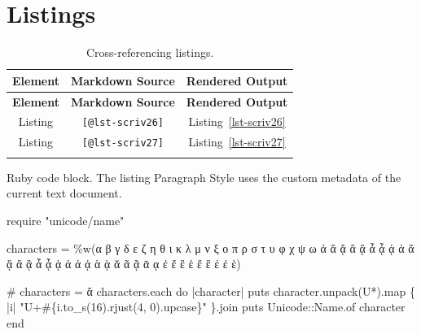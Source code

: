 \documentclass[
  12pt,
  a4paper,
  oneside,
  numbers=noenddot,
  titlepage,
  toclink=all,
  toc=bibliography]{scrbook}
\newenvironment{Shaded}{\begin{snugshade}}{\end{snugshade}}
\newcommand{\AttributeTok}[1]{\textcolor[rgb]{0.40,0.45,0.13}{#1}}
\newcommand{\CharTok}[1]{\textcolor[rgb]{0.13,0.47,0.30}{#1}}
\newcommand{\CommentTok}[1]{\textcolor[rgb]{0.37,0.37,0.37}{#1}}
\newcommand{\ControlFlowTok}[1]{\textcolor[rgb]{0.00,0.23,0.31}{#1}}
\newcommand{\DataTypeTok}[1]{\textcolor[rgb]{0.68,0.00,0.00}{#1}}
\newcommand{\DecValTok}[1]{\textcolor[rgb]{0.68,0.00,0.00}{#1}}
\newcommand{\FunctionTok}[1]{\textcolor[rgb]{0.28,0.35,0.67}{#1}}
\newcommand{\KeywordTok}[1]{\textcolor[rgb]{0.00,0.23,0.31}{#1}}
\newcommand{\NormalTok}[1]{\textcolor[rgb]{0.00,0.23,0.31}{#1}}
\newcommand{\OtherTok}[1]{\textcolor[rgb]{0.00,0.23,0.31}{#1}}
\newcommand{\SpecialCharTok}[1]{\textcolor[rgb]{0.37,0.37,0.37}{#1}}
\newcommand{\StringTok}[1]{\textcolor[rgb]{0.13,0.47,0.30}{#1}}
\newcommand{\VerbatimStringTok}[1]{\textcolor[rgb]{0.13,0.47,0.30}{#1}}
\theoremstyle{definition}
\theoremstyle{definition}
\theoremstyle{definition}
\theoremstyle{plain}
\theoremstyle{plain}
\theoremstyle{plain}
\theoremstyle{plain}
\theoremstyle{plain}
\theoremstyle{remark}
\begin{document}
\newpage{}

\hypertarget{sec-scriv25}{%
\section{Listings}\label{sec-scriv25}}

\hypertarget{tbl-scriv25}{}
\begin{longtable}[]{@{}ccc@{}}
\toprule\noalign{}
\textbf{Element} & \textbf{Markdown Source} & \textbf{Rendered
Output} \\
\midrule\noalign{}
\endfirsthead
\toprule\noalign{}
\textbf{Element} & \textbf{Markdown Source} & \textbf{Rendered
Output} \\
\midrule\noalign{}
\endhead
\bottomrule\noalign{}
\endlastfoot
Listing & \texttt{{[}@lst-scriv26{]}} &
\protect\hypertarget{cite_82}{}{\label{cite_82}Listing~\ref{lst-scriv26}} \\
Listing & \texttt{{[}@lst-scriv27{]}} &
\protect\hypertarget{cite_83}{}{\label{cite_83}Listing~\ref{lst-scriv27}} \\
\caption{\label{tbl-scriv25}Cross-referencing listings.}\tabularnewline
\end{longtable}

\begin{codelisting}

\caption{Ruby code block. The listing Paragraph Style uses the custom
metadata of the current text document.}

\hypertarget{lst-scriv26}{%
\label{lst-scriv26}}%
\begin{Shaded}
\begin{Highlighting}[numbers=left,,]
\FunctionTok{require} \StringTok{"unicode/name"}

\NormalTok{characters }\KeywordTok{=}\OtherTok{ \%w(}\StringTok{α β γ δ ε ζ η θ ι κ λ μ ν ξ ο π ρ σ τ υ φ χ ψ ω }
\StringTok{ἀ ἄ ᾄ ἂ ᾂ ἆ ᾆ ᾀ ἁ ἅ ᾅ ἃ ᾃ ἇ ᾇ ᾁ ά ά ᾴ ὰ ᾲ ᾰ ᾶ ᾷ ᾱ ᾳ ἐ ἔ ἒ ἑ ἕ ἓ έ έ ὲ}\OtherTok{)}

\CommentTok{\# characters = \textquotesingle{}ἄ\textquotesingle{}}
\NormalTok{characters}\AttributeTok{.each} \ControlFlowTok{do} \KeywordTok{|}\NormalTok{character}\KeywordTok{|}
  \FunctionTok{puts}\NormalTok{ character}\AttributeTok{.unpack}\NormalTok{(}\VerbatimStringTok{\textquotesingle{}U*\textquotesingle{}}\NormalTok{)}\AttributeTok{.map} \KeywordTok{\{} \KeywordTok{|}\NormalTok{i}\KeywordTok{|} 
  \StringTok{"U+}\SpecialCharTok{\#\{}\NormalTok{i}\AttributeTok{.to\_s}\NormalTok{(}\DecValTok{16}\NormalTok{)}\AttributeTok{.rjust}\NormalTok{(}\DecValTok{4}\NormalTok{, }\CharTok{\textquotesingle{}0\textquotesingle{}}\NormalTok{)}\AttributeTok{.upcase}\SpecialCharTok{\}}\StringTok{"}
  \KeywordTok{\}}\AttributeTok{.join}
  \FunctionTok{puts} \DataTypeTok{Unicode}\KeywordTok{::}\DataTypeTok{Name}\AttributeTok{.of}\NormalTok{ character}
\ControlFlowTok{end}
\end{Highlighting}
\end{Shaded}

\end{codelisting}
\end{document}
